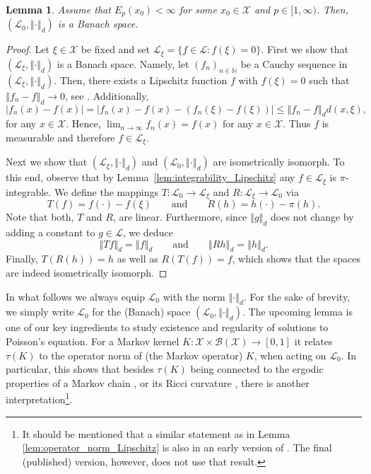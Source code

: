 \documentclass[12pt]{article}
\theoremstyle{plain}
\newtheorem{lem}[thm]{Lemma}
\newcommand{\norm}[1]{\left\Vert #1 \right\Vert}
\newcommand{\N}{\mathbb{N}}
\newcommand{\cX}{\mathcal{X}}
\begin{document}
{\begin{lem}\label{lem:L_0_Banachspace}
Assume that $E_p(x_0) < \infty$ for some $x_0 \in \cX$ and $p \in [1,\infty)$. Then, $(\mathscr{L}_0, \norm{\cdot}_d)$ is a Banach space. 
\end{lem}

\begin{proof}
Let $\xi \in \cX$ be fixed and set $\mathscr{L}_\xi = \{ f \in \mathscr{L} \colon f (\xi)=0\}$.
First we show that $(\mathscr{L}_\xi, \norm{\cdot}_d)$ is a Banach space. 
Namely, let $(f_n)_{n \in \N}$ be a Cauchy sequence in $(\mathscr{L}_\xi, \norm{\cdot}_d)$. Then, there exists a Lipschitz function $f$ with $f(\xi)=0$ such that $\norm{f_n -f}_d \to 0$, see \cite[Theorem 8.1.3]{cobzacs2019lipschitz}.
Additionally, 
\[
\vert f_n(x) - f(x) \vert = \vert f_n(x) - f(x) - (f_n(\xi) -f(\xi)) \vert \leq \norm{f_n - f}_d d(x, \xi),
\]
for any $x \in \cX$. 
Hence, $\lim_{n \to \infty}f_n (x) = f(x)$ for any $x \in \cX$. Thus $f$ is measurable and therefore $f \in \mathscr{L}_\xi$. 

Next we show that $(\mathscr{L}_\xi, \norm{\cdot}_d )$ and $(\mathscr{L}_0, \norm{\cdot}_d)$ are isometrically isomorph. 
To this end, observe that by Lemma~\ref{lem:integrability_Lipschitz} any $f \in \mathscr{L}_\xi$ is $\pi$-integrable.  
We define the mappings $T \colon \mathscr{L}_0 \to \mathscr{L}_\xi$ and $R \colon \mathscr{L}_\xi \to \mathscr{L}_0$ via 
\[
T(f) = f(\cdot) - f(\xi)  \qquad\text{and} \qquad R(h) = h(\cdot) - \pi(h). 
\] 
Note that both, $T$ and $R$, are linear. Furthermore, since $\norm{g}_d$ does not change by adding a constant to $g \in \mathscr{L}$, we deduce 
\[
\norm{Tf }_d = \norm{f}_d \qquad\text{and}\qquad \norm{Rh}_d= \norm{h}_d.
\]
Finally, $T (R(h)) = h$ as well as $R(T(f)) = f$, which shows that the spaces are indeed isometrically isomorph. 
\end{proof}

In what follows we always equip $\mathscr{L}_0$ with the norm $\norm{\cdot}_d$. For the sake of brevity, we simply write $\mathscr{L}_0$ for the (Banach) space $(\mathscr{L}_0, \norm{\cdot}_d)$.
The upcoming lemma is one of our key ingredients to study existence and regularity of solutions to Poisson's equation. 
For a Markov kernel $K\colon \cX \times \mathcal{B}(\cX) \to [0,1]$ it relates $\tau(K)$ to the operator norm of  (the Markov operator) $K$, when acting on $\mathscr{L}_0$.  
In particular, this shows that besides $\tau(K)$ being connected to the ergodic properties of a Markov chain \cite{douc2018markov,rudolf2018pertubation}, or its Ricci curvature \cite{ollivier2009ricci,Joulin2010Curvature,paulin2016mixing}, there is another interpretation\footnote{It should be mentioned that a similar statement as in Lemma \ref{lem:operator_norm_Lipschitz} is also in an early version of \cite{rudolf2018pertubation}. The final (published) version, however, does not use that result.}. 

}
\end{document}
